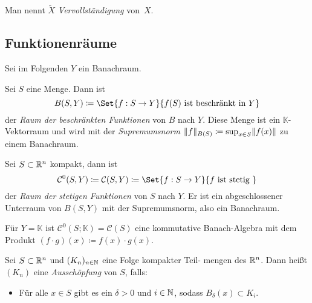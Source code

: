 \documentclass{cheat-sheet}
\newcommand{\K}{\mathbb{K}}
\begin{document}
\begin{definition}
  Man nennt $\widetilde{X}$ \emph{Vervollständigung} von~$X$.
\end{definition}

\subsection{Funktionenräume}

\begin{nota}
  Sei im Folgenden $Y$ ein Banachraum.
\end{nota}

\begin{definition}
  Sei $S$ eine Menge. Dann ist
  \[ B(S, Y) \coloneqq \Set{ f : S \to Y }{ f(S) \text { ist beschränkt in } Y } \]
  der \emph{Raum der beschränkten Funktionen} von $B$ nach $Y$. Diese Menge ist ein $\K$-Vektorraum und wird mit der \emph{Supremumsnorm} $\lVert f\rVert_{B(S)} \coloneqq \sup_{x \in S} \lVert f(x)\rVert$ zu einem Banachraum.
\end{definition}

\begin{definition}
  Sei $S \subset \mathbb{R}^n$ kompakt, dann ist
  \[ \mathcal{C}^0(S, Y) \coloneqq \mathcal{C}(S, Y) \coloneqq \Set{ f : S \to Y }{ f \text{ ist stetig } } \]
  der \emph{Raum der stetigen Funktionen} von $S$ nach $Y$. Er ist ein abgeschlossener Unterraum von $B(S, Y)$ mit der Supremumsnorm, also ein Banachraum.
\end{definition}


\begin{bem}
  Für $Y = \K$ ist $\mathcal{C}^0(S; \K) = \mathcal{C}(S)$ eine kommutative Banach-Algebra mit dem Produkt $(f \cdot g)(x) \coloneqq f(x) \cdot g(x)$.
\end{bem}

\begin{definition}
  Sei $S \subset \mathbb{R}^n$ und $(K_n)_{n \in \mathbb{N}}$ eine Folge kompakter Teil- mengen des $\mathbb{R}^n$. Dann heißt $(K_n)$ eine \emph{Ausschöpfung} von $S$, falls:
  \begin{itemize}
    \item Für alle $x \in S$ gibt es ein $\delta > 0$ und $i \in \mathbb{N}$, sodass $B_\delta(x) \subset K_i$.
    \\[-4pt]
  \end{itemize}
\end{definition}
\end{document}
